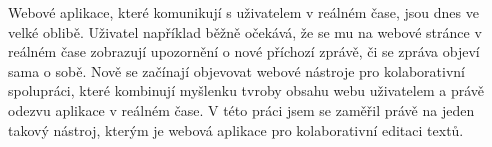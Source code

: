 
Webové aplikace, které komunikují s uživatelem v reálném čase, jsou dnes ve velké oblibě.
Uživatel například běžně očekává, že se mu na webové stránce v reálném čase zobrazují upozornění o nové příchozí zprávě, či se zpráva objeví sama o sobě.
Nově se začínají objevovat webové nástroje pro kolaborativní spolupráci, které kombinují myšlenku tvroby obsahu webu uživatelem a právě odezvu aplikace v reálném čase.
V této práci jsem se zaměřil právě na jeden takový nástroj, kterým je webová aplikace pro kolaborativní editaci textů.







